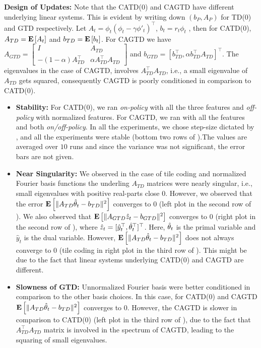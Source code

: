 \textbf{Design of Updates:} Note that the CATD(0) and CAGTD have different underlying linear systems. This is evident by writing down $(b_P,A_P)$ for TD(0) and GTD respectively. Let $A_t=\phi_t(\phi_t-\gamma\phi'_t)^\top$, $b_t=r_t \phi_t$ , then for CATD(0), $A_{TD}=\mathbf{E}\left[A_t\right]$ and $b_{TD}=\mathbf{E}\left[b_t\right]$.  For CAGTD we have $A_{GTD}=\left[\begin{matrix}I & A_{TD} \\ -(1-\alpha )A_{TD}^\top &\alpha A_{TD}^\top A_{TD}\end{matrix}\right]$ and $b_{GTD}=[b_{TD}^\top,\alpha b_{TD}^\top A_{TD}]^\top$. The eigenvalues in the case of  CAGTD, involves $A_{TD}^\top A_{TD}$, i.e., a small eigenvalue of $A_{TD}$ gets squared, consequently CAGTD is poorly conditioned in comparison to CATD(0).

\begin{itemize}[leftmargin=*]
\item \textbf{Stability:} For CATD(0), we ran  \emph{on-policy} with all the three features and \emph{off-policy} with normalized features. For CAGTD, we ran with all the features and both \emph{on/off-policy}. In all the experiments, we chose step-size dictated by , and all the experiments were stable (bottom two rows of ).The values are averaged over $10$ runs and since the variance was not significant, the error bars are not given.
\item \textbf{Near Singularity: } We observed in the case of tile coding and normalized Fourier basis functions the underling $A_{TD}$ matrices were nearly singular, i.e., small eigenvalues with positive real-parts close $0$. However, we observed that the error $\mathbf{E}\left[\| A_{TD}\hat{\theta}_t -b_{TD}\|^2\right]$ converges to $0$ (left plot in the second row of ). We also observed that $\mathbf{E}\left[\| A_{GTD}\hat{z}_t-b_{GTD}\|^2\right]$ converges to $0$ (right plot in the second row of ), where $\hat{z}_t=[\hat{y}_t^\top,\hat{\theta}_t^\top]^\top$. Here, $\hat{\theta}_t$ is the primal variable and $\hat{y}_t$ is the dual variable. However, $\mathbf{E}\left[\| A_{TD}\hat{\theta}_t-b_{TD}\|^2\right]$ does not always converge to $0$ (tile coding in right plot in the third row of ). This might be due to the fact that linear systems underlying CATD(0) and CAGTD are different. 
\item \textbf{Slowness of GTD:} Unnormalized Fourier basis were better conditioned in comparison to the other basis choices. In this case, for CATD(0) and CAGTD $\mathbf{E}\left[\| A_{TD}\hat{\theta}_t -b_{TD}\|^2\right]$ converges to $0$. However, the CAGTD is slower in comparison to CATD(0) (left plot in the third row of ), due to the fact that $A^\top_{TD}A_{TD}$ matrix is involved in the spectrum of CAGTD, leading to the squaring of small eigenvalues.
\end{itemize}

